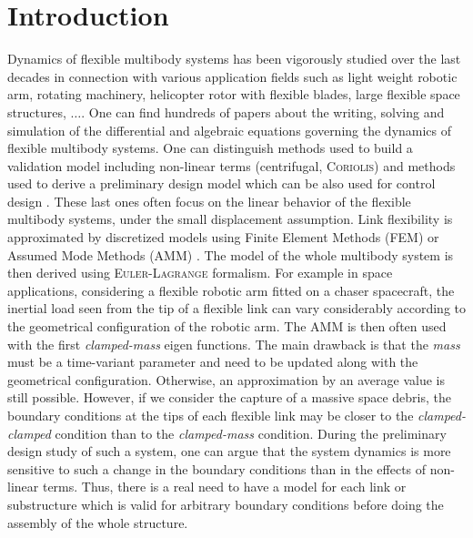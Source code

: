 \documentclass[smallcondensed]{svjour3}     %
\begin{document}
\section{Introduction}
\label{intro} 
Dynamics of flexible multibody systems has been vigorously studied over the last decades in connection with various application fields such as light weight robotic arm, rotating machinery, helicopter rotor with flexible blades, large flexible space structures, $\dots$. One can find hundreds of papers about the writing, solving and simulation of the differential and algebraic equations governing the dynamics of flexible multibody systems\cite{Schiehlen97,ShabanaMSD1997}. One can distinguish methods used to build a validation model including non-linear terms (centrifugal, \textsc{Coriolis}) \cite{MohanSahaMSD2007,DeLucaSiciliano} and methods used to derive a preliminary design model which can be also used for control design \cite{Krauss2010,Murali2015}. These last ones often focus on the linear behavior of the flexible multibody systems, under the small displacement assumption. Link flexibility is approximated by discretized models using Finite Element Methods (FEM) or Assumed Mode Methods (AMM) \cite{TheodoreG95}. The model of the whole multibody system is then derived using \textsc{Euler-Lagrange} formalism.  For example in space applications, considering a flexible robotic arm fitted on a chaser spacecraft, the inertial load seen from the tip of a flexible link can vary considerably according to the geometrical configuration of the robotic arm. The AMM is then often used \cite{DeLucaSiciliano,TheodoreG95} with the first \textit{clamped-mass} eigen functions. The main drawback is that the \textit{mass} must be a time-variant parameter and need to be updated along with the geometrical configuration. Otherwise, an approximation by an average value is still possible. However, if we consider the capture of a massive space debris, the boundary conditions at the tips of each flexible link may be closer to the \textit{clamped-clamped} condition than to the \textit{clamped-mass} condition. During the preliminary design study of such a system, one can argue that the system dynamics is more sensitive to such a change in the boundary conditions than in the effects of non-linear terms.  Thus, there is a real need to have a model for each link or substructure which is valid for arbitrary boundary conditions before doing the assembly of the whole structure.
\end{document}
